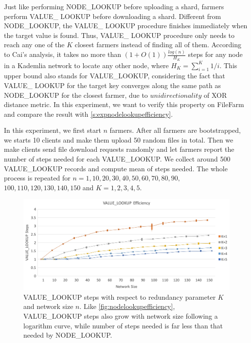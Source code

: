 Just like performing NODE\_LOOKUP before uploading a shard, farmers perform VALUE\_ LOOKUP before downloading a shard. Different from NODE\_LOOKUP, the VALUE\_ LOOKUP procedure finishes immediately when the target value is found. Thus, VALUE\_ LOOKUP procedure only needs to reach any one of the $K$ closest farmers instead of finding all of them. According to Cai's analysis\cite{cai2013probabilistic}, it takes no more than $(1+O(1))\frac{log(n)}{H_{K}}$ steps for any node in a Kademlia network to locate any other node, where $H_K = \sum_{i=1}^{K} 1/i$. This upper bound also stands for VALUE\_LOOKUP, considering the fact that VALUE\_ LOOKUP for the target key converges along the same path as NODE\_LOOKUP for the closest farmer, due to $unidirectionality$ of XOR distance metric. In this experiment, we want to verify this property on FileFarm and compare the result with \ref{s:expnodelookupefficiency}.

In this experiment, we first start $n$ farmers. After all farmers are bootstrapped, we starts 10 clients and make them upload 50 random files in total. Then we make clients send file download requests randomly and let farmers report the number of steps needed for each VALUE\_LOOKUP. We collect around 500 VALUE\_LOOKUP records and compute mean of steps needed. The whole process is repeated for  $n=1,10,20,30,40,50,60,70,80,90,$ $100,110,120,130,140,150$ and $K=1,2,3,4,5$.

\begin{figure}[hbt]
\centering
  \includegraphics[width=14cm]{charts/chart_value_lookup_efficiency.png}
  \caption[VALUE\_LOOKUP steps with respect to $K$ and network size $n$]{VALUE\_LOOKUP steps with respect to redundancy parameter $K$ and network size $n$. Like \ref{fig:nodelookupefficiency}, VALUE\_LOOKUP steps also grow with network size following a logarithm curve, while number of steps needed is far less than that needed by NODE\_LOOKUP.}
  \label{fig:valuelookupefficiency}
\end{figure}

